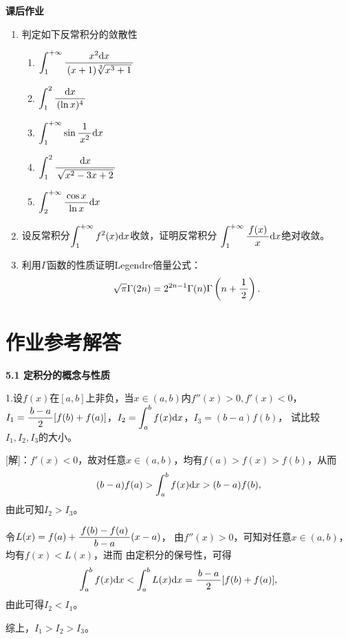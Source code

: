 \begin{ext}
	{\bf 课后作业}	
	\begin{enumerate}
	  \item 判定如下反常积分的敛散性
	  \begin{enumerate}[(1)]
	    \item $\displaystyle\int_1^{+\infty}\displaystyle\frac{\,{x^2\mathrm{d} x}\,}{\,{(x+1)\sqrt[2]{x^3+1}}\,}$
	    \item $\displaystyle\int_1^2\displaystyle\frac{\,{\mathrm{d} x}\,}{\,{(\ln x)^4}\,}$
	    \item $\displaystyle\int_1^{+\infty}\sin\displaystyle\frac{\,{1}\,}{\,{x^2}\,}\mathrm{d} x$
	    \item $\displaystyle\int_1^2\displaystyle\frac{\,{\mathrm{d} x}\,}{\,{\sqrt{x^2-3x+2}}\,}$
	    \item $\displaystyle\int_2^{+\infty}\displaystyle\frac{\,{\cos x}\,}{\,{\ln x}\,}\mathrm{d} x$
	  \end{enumerate}
	  \item 设反常积分$\displaystyle\int_1^{+\infty}f^2(x)\mathrm{d} x$收敛，证明反常积分
	  $\displaystyle\int_1^{+\infty}\displaystyle\frac{\,{f(x)}\,}{\,{x}\,}\mathrm{d} x$绝对收敛。
	  \item 利用$\Gamma$函数的性质证明{\kaishu Legendre倍量公式}：
	  $$\sqrt{\pi}\Gamma(2n)=2^{2n-1}\Gamma(n)\Gamma\left(n+\displaystyle\frac{\,{1}\,}{\,{2}\,}\right).$$
	\end{enumerate}
\end{ext}

\visibletrue

\ifvisible

\newpage

\section*{作业参考解答}

\begin{center}
	\bf 5.1 定积分的概念与性质
\end{center}

\bigskip

1.设$f(x)$在$[a,b]$上非负，当$x\in(a,b)$内$f''(x)>0,f'(x)<0$，
$I_1=\displaystyle\frac{\,{b-a}\,}{\,{2}\,}[f(b)+f(a)]$，$I_2=\displaystyle\int_a^bf(x)\mathrm{d} x$，$I_3=(b-a)f(b)$，
试比较$I_1,I_2,I_3$的大小。

[解]：$f'(x)<0$，故对任意$x\in(a,b)$，均有$f(a)>f(x)>f(b)$，从而
$$(b-a)f(a)>\displaystyle\int_a^bf(x)\mathrm{d} x>(b-a)f(b),$$
由此可知$I_2>I_3$。

令$L(x)=f(a)+\displaystyle\frac{\,{f(b)-f(a)}\,}{\,{b-a}\,}(x-a)$，
由$f''(x)>0$，可知对任意$x\in(a,b)$，均有$f(x)<L(x)$，进而
由定积分的保号性，可得
$$\displaystyle\int_a^bf(x)\mathrm{d} x<\displaystyle\int_a^bL(x)\mathrm{d} x=\displaystyle\frac{\,{b-a}\,}{\,{2}\,}[f(b)+f(a)],$$
由此可得$I_2<I_1$。

综上，$I_1>I_2>I_3$。\fin

